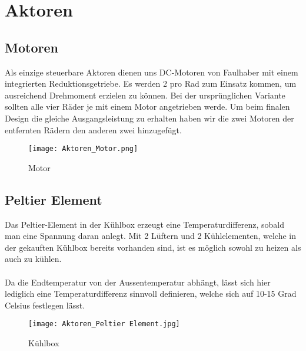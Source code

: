 \section{Aktoren}

\subsection{Motoren}
Als einzige steuerbare Aktoren dienen uns DC-Motoren von Faulhaber mit einem integrierten Reduktionsgetriebe. Es werden 2 pro Rad zum Einsatz kommen, um ausreichend Drehmoment erzielen zu können.  Bei der ursprünglichen Variante sollten alle vier Räder je mit einem Motor angetrieben werde. Um beim finalen Design die gleiche Ausgangsleistung zu erhalten haben wir die zwei Motoren der entfernten Rädern den anderen zwei hinzugefügt.

\begin{figure}[H]
    \begin{center}
    \texttt{[image: Aktoren\_Motor.png]}
    \end{center}
    \caption{Motor}
\end{figure}

\subsection{Peltier Element}
Das Peltier-Element in der Kühlbox erzeugt eine Temperaturdifferenz, sobald man eine Spannung daran anlegt. Mit 2 Lüftern und 2 Kühlelementen, welche in der gekauften Kühlbox bereits vorhanden sind, ist es möglich sowohl zu heizen als auch zu kühlen. \\
\\
Da die Endtemperatur von der Aussentemperatur abhängt, lässt sich hier lediglich eine Temperaturdifferenz sinnvoll definieren, welche sich auf 10-15 Grad Celsius festlegen lässt.
\begin{figure}[H]
    \begin{center}
    \texttt{[image: Aktoren\_Peltier Element.jpg]}
    \end{center}
    \caption{Kühlbox}
\end{figure}